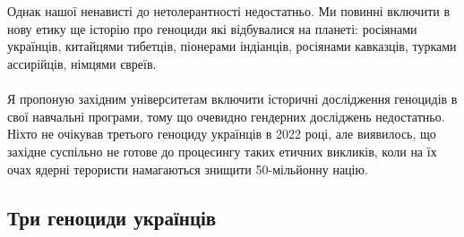 \\
\\
Однак нашої ненависті до нетолерантності недостатньо. Ми повинні включити в нову етику ще історію про геноциди які відбувалися на планеті: росіянами українців, китайцями тибетців, піонерами індіанців, росіянами кавказців, турками ассирійців, німцями євреїв.
\\
\\
Я пропоную західним університетам включити історичні дослідження геноцидів в свої навчальні програми, тому що очевидно гендерних досліджень недостатньо. Ніхто не очікував третього геноциду українців в 2022 році, але виявилось, що західне суспільно не готове до процесингу таких етичних викликів, коли на їх очах ядерні терористи намагаються знищити 50-мільйонну націю.

\subsection{Три геноциди українців}


\normalsize
